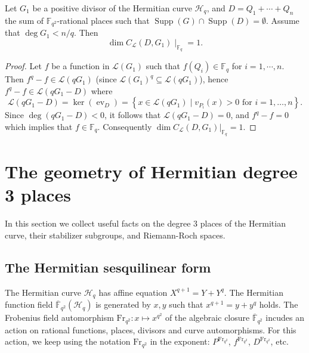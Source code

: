 \documentclass[entropy,article,submit,pdftex,moreauthors]{Definitions/mdpi}
\newcommand{\Supp}{\operatorname{Supp}}
\newcommand{\Frob}{{\mathrm{Fr}_{q^2}}}
\begin{document}
\begin{Proposition} \label{prop:sub}
	Let $G_1$ be a positive divisor of the Hermitian curve $\mathscr{H}_q$, and $D=Q_1+\cdots+Q_n$ the sum of $\mathbb{F}_{q^2}$-rational places such that $\Supp(G)\cap \Supp(D)=\emptyset$. Assume that $\deg G_1 < n/q$. Then 
	\[
	\dim C_{\mathcal{L}}(D,G_1) \mid_{\mathbb{F}_q} = 1.
	\]
\end{Proposition}
\begin{proof}
	Let $f$ be a function in $\mathscr{L}(G_1)$ such that $f(Q_i) \in \mathbb{F}_q$ for $i=1,\cdots,n$. Then $f^q -f \in \mathscr{L}(qG_1)$ (since $\mathscr{L}(G_1)^q \subseteq \mathscr{L}(qG_1)$), hence $f^q - f \in  \mathscr{L}(qG_1-D)$ where
	\[\mathscr{L}(qG_1-D) = \ker \left(\operatorname{ev}_{D}\right)=\left\{x \in \mathscr{L}(qG_1) \mid v_{P_i}(x)>0 \text { for } i=1, \ldots, n\right\} .\]
	Since $\deg(qG_1-D)<0$, it follows that $\mathscr{L}(qG_1 - D)=0$, and  $f^q -f =0$ which implies that $f \in \mathbb{F}_q$. Consequently $\dim C_{\mathcal{L}}(D,G_1)|_{ \mathbb{F}_q}= 1$.
\end{proof}






\section{The geometry of Hermitian degree 3 places} \label{sec:geometry}

In this section we collect useful facts on the degree 3 places of the Hermitian curve, their stabilizer subgroups, and Riemann-Roch spaces. 

\subsection{The Hermitian sesquilinear form} \label{ssec:h-form}
The Hermitian curve $\mathscr{H}_q$ has affine equation $X^{q+1}=Y+Y^q$. The Hermitian function field $\overline{\mathbb{F}}_{q^2}(\mathscr{H}_q)$ is generated by $x,y$ such that $x^{q+1}=y+y^q$ holds. The Frobenius field automorphism $\Frob:x\mapsto x^{q^2}$ of the algebraic closure $\overline{\mathbb{F}}_{q^2}$ incudes an action on rational functions, places, divisors and curve automorphisms. For this action, we keep using the notation $\Frob$ in the exponent: $P^\Frob$, $f^\Frob$, $D^\Frob$, etc. 
\end{document}

